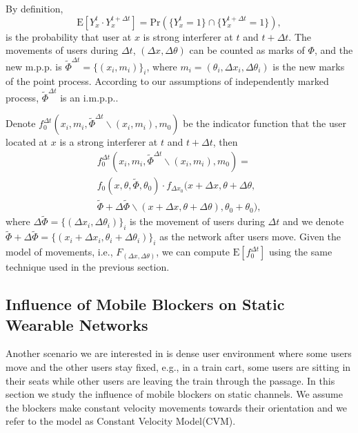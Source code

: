 \documentclass[10pt, conference, letterpaper]{IEEEtran}
\begin{document}
By definition, 
\begin{equation*}
\mathrm{E}[Y_x^t\cdot Y_x^{t + \Delta t}] = \mathrm{Pr}(\{Y_x^t=1\}\cap \{Y_x^{t+\Delta t}=1\}),
\end{equation*}
is the probability that user at $x$ is strong interferer at $t$ and $t + \Delta t$. The movements of users during $\Delta t$, $(\Delta x, \Delta \theta)$ can be counted as marks of $\Phi$, and the new m.p.p. is $\tilde{\Phi}^{\Delta t} = \{(x_i, m_i)\}_i$, where $m_i = (\theta_i, \Delta x_i, \Delta \theta_i)$ is the new marks of the point process. According to our assumptions of independently marked process, $\tilde{\Phi}^{\Delta t}$ is an i.m.p.p.. 

Denote $f_0^{\Delta  t}(x_i, m_i, \tilde{\Phi}^{\Delta t}\backslash (x_i, m_i), m_0)$ be the indicator function that the user located at $x$ is a strong interferer at $t$ and $t + \Delta t$, then 
\begin{multline*}
f_0^{\Delta  t}(x_i, m_i, \tilde{\Phi}^{\Delta t}\backslash (x_i, m_i), m_0) = \\
f_0(x,\theta, \tilde{\Phi}, \theta_0) 
\cdot f_{\Delta x_0}(x+\Delta x,\theta + \Delta \theta, 
\\ \tilde{\Phi} + \Delta \tilde{\Phi}\backslash (x+\Delta x,\theta + \Delta \theta), \theta_0+\theta_0),
\end{multline*}
where $\Delta \tilde{\Phi} = \{(\Delta x_i, \Delta \theta_i)\}_i$ is the movement of users during $\Delta t$ and we denote $\tilde{\Phi} + \Delta \tilde{\Phi} = \{(x_i+\Delta x_i, \theta_i + \Delta \theta_i)\}_i$ as the network after users move.  
Given the model of movements, i.e., $F_{(\Delta x, \Delta \theta)}$, we can compute $\mathrm{E}[f_0^{\Delta t}]$ using the same technique used in the previous section. 


\subsection{Influence of Mobile Blockers on Static Wearable Networks}\label{subsection:largemobility}
Another scenario we are interested in is dense user environment where some users move and the other users stay fixed, e.g., in a train cart, some users are sitting in their seats while other users are leaving the train through the passage. 
In this section we study the influence of mobile blockers on static channels. We assume the blockers make constant velocity movements towards their orientation and we refer to the model as Constant Velocity Model(CVM).
\end{document}
